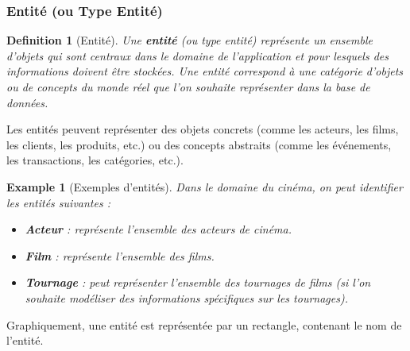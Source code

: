 \documentclass{article}
\newtheorem{definition}{Definition}
\newtheorem{example}{Example}
\begin{document}
\subsubsection{Entité (ou Type Entité)}

\begin{definition}[Entité]
    Une \textbf{entité} (ou type entité) représente un ensemble d'objets qui sont centraux dans le domaine de l'application et pour lesquels des informations doivent être stockées.  Une entité correspond à une catégorie d'objets ou de concepts du monde réel que l'on souhaite représenter dans la base de données.
\end{definition}

Les entités peuvent représenter des objets concrets (comme les acteurs, les films, les clients, les produits, etc.) ou des concepts abstraits (comme les événements, les transactions, les catégories, etc.).

\begin{example}[Exemples d'entités]
    Dans le domaine du cinéma, on peut identifier les entités suivantes :
    \begin{itemize}
        \item \textbf{Acteur} : représente l'ensemble des acteurs de cinéma.
        \item \textbf{Film} : représente l'ensemble des films.
        \item \textbf{Tournage} : peut représenter l'ensemble des tournages de films (si l'on souhaite modéliser des informations spécifiques sur les tournages).
    \end{itemize}
\end{example}

Graphiquement, une entité est représentée par un rectangle, contenant le nom de l'entité.
\end{document}
